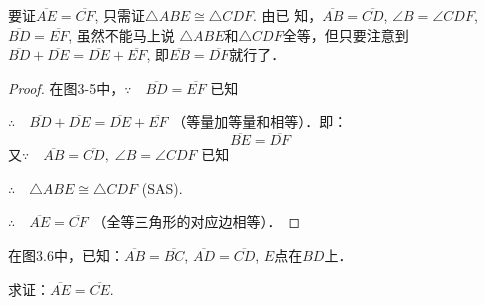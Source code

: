\begin{analyze}
    要证$\overline{AE}=\overline{CF}$, 只需证$\triangle ABE\cong \triangle CDF$. 由已
知，$\overline{AB}=\overline{CD}$, $\angle B=\angle CDF$, $\overline{BD}=\overline{EF}$, 虽然不能马上说
$\triangle ABE$和$\triangle CDF$全等，但只要注意到$\overline{BD}+\overline{DE}=\overline{DE}+\overline{EF}$, 
即$\overline{EB}=\overline{DF}$就行了．
\end{analyze}

\begin{proof}
    在图3-5中，$\because\quad \overline{BD}=\overline{EF}$ 已知

$\therefore\quad \overline{BD}+\overline{DE}=\overline{DE}+\overline{EF}$ （等量加等量和相等）．即：
\[\overline{BE}=\overline{DF}\]
又$\because\quad \overline{AB}=\overline{CD},\; \angle B =\angle CDF$ 已知

$\therefore\quad \triangle ABE\cong \triangle CDF$ (SAS).

$\therefore\quad \overline{AE}=\overline{CF}$ （全等三角形的对应边相等）．
\end{proof}

\begin{figure}[htp]\centering
    \begin{minipage}[t]{0.48\textwidth}
    \centering
{}
    \caption{ }
    \end{minipage}
    \begin{minipage}[t]{0.48\textwidth}
    \centering
    \caption{ }
    \end{minipage}
    \end{figure}

\begin{example}
    在图3.6中，已知：$\overline{AB}=\overline{BC}$, $\overline{AD}=\overline{CD}$, $E$点在$BD$上．

求证：$\overline{AE}=\overline{CE}$.
\end{example}

